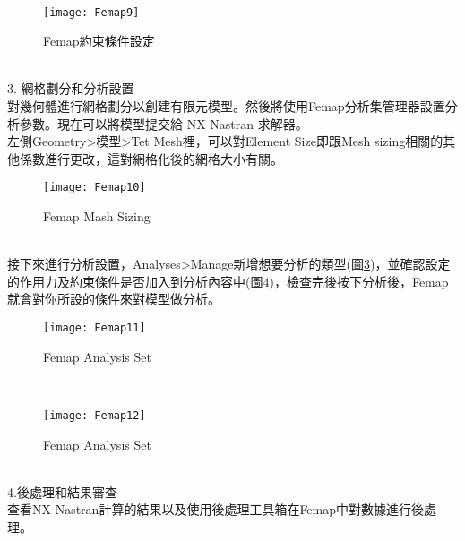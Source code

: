 \begin{itemize}
\begin{figure}[hbt!]
\begin{center}
\end{center}
\end{figure}
\\
\begin{figure}[hbt!]
\begin{center}
\texttt{[image: Femap9]}
\caption{\Large Femap約束條件設定}\label{3.09}
\end{center}
\end{figure}
\\
3. 網格劃分和分析設置\\
\qquad 對幾何體進行網格劃分以創建有限元模型。然後將使用Femap分析集管理器設置分析參數。現在可以將模型提交給 NX Nastran 求解器。\\

\qquad 左側Geometry>模型>Tet Mesh裡，可以對Element Size即跟Mesh sizing相關的其他係數進行更改，這對網格化後的網格大小有關。\\
\begin{figure}[hbt!]
\begin{center}
\texttt{[image: Femap10]}
\caption{\Large Femap Mash Sizing}\label{3.10}
\end{center}
\end{figure}
\\
\qquad 接下來進行分析設置，Analyses>Manage新增想要分析的類型(圖\ref{3.11})，並確認設定的作用力及約束條件是否加入到分析內容中(圖\ref{3.12})，檢查完後按下分析後，Femap就會對你所設的條件來對模型做分析。\\
\begin{figure}[hbt!]
\begin{center}
\texttt{[image: Femap11]}
\caption{\Large Femap Analysis Set}\label{3.11}
\end{center}
\end{figure}
\\
\begin{figure}[hbt!]
\begin{center}
\texttt{[image: Femap12]}
\caption{\Large Femap Analysis Set}\label{3.12}
\end{center}
\end{figure}
\\
4.後處理和結果審查\\
\qquad 查看NX Nastran計算的結果以及使用後處理工具箱在Femap中對數據進行後處理。\\


\end{itemize}
